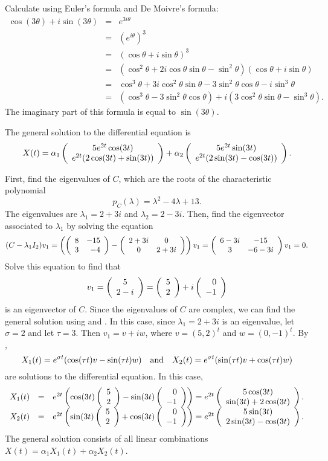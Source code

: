 \soln Calculate using Euler's formula and De Moivre's formula:
\[
\begin{array}{rcl}
\cos(3\theta) + i\sin(3\theta)
& = & e^{3i\theta} \\
& = & (e^{i\theta})^3 \\
& = & (\cos\theta + i\sin\theta)^3 \\
& = & (\cos^2\theta + 2i\cos\theta\sin\theta - \sin^2\theta)
(\cos\theta + i\sin\theta) \\
& = & \cos^3\theta + 3i\cos^2\theta\sin\theta -
3\sin^2\theta\cos\theta - i\sin^3\theta \\
& = & (\cos^3\theta - 3\sin^2\theta\cos\theta) +
i(3\cos^2\theta\sin\theta - \sin^3\theta).
\end{array}
\]
The imaginary part of this formula is equal to $\sin(3\theta)$.

\ans The general solution to the differential equation is
\[
X(t) =
\alpha_1\left(\begin{array}{c} 5e^{2t}\cos(3t) \\ e^{2t}(2\cos(3t) + \sin(3t))\end{array}\right) +
\alpha_2\left(\begin{array}{c} 5e^{2t}\sin(3t) \\ e^{2t}(2\sin(3t) - \cos(3t))\end{array}\right).
\]

\soln First, find the eigenvalues of $C$, which are the roots of the
characteristic polynomial
\[
p_C(\lambda) = \lambda^2 - 4\lambda + 13.
\]
The eigenvalues are $\lambda_1 = 2 + 3i$ and $\lambda_2 = 2 - 3i$.  Then,
find the eigenvector associated to $\lambda_1$ by solving the equation
\[
(C - \lambda_1I_2)v_1 =
\left(\left(\begin{array}{rr} 8 & -15\\ 3 &-4\end{array}\right) - \left(\begin{array}{cc} 2 + 3i & 0\\ 0 &2 + 3i\end{array}\right)\right)v_1
= \left(\begin{array}{cc} 6 - 3i & -15\\ 3 &-6 - 3i\end{array}\right)v_1 = 0.
\]
Solve this equation to find that
\[
v_1 = \left(\begin{array}{c} 5 \\ 2 - i\end{array}\right) = \left(\begin{array}{r} 5 \\ 2\end{array}\right) + i\left(\begin{array}{r} 0 \\ -1\end{array}\right)
\]
is an eigenvector of $C$.  Since the eigenvalues of $C$ are complex, we
can find the general solution using  and .  In this
case, since $\lambda_1 = 2 + 3i$ is
an eigenvalue, let $\sigma = 2$ and let $\tau = 3$.  Then $v_1 = v + iw$,
where $v = (5,2)^t$ and $w = (0,-1)^t$.  By ,
\[
X_1(t) = e^{\sigma t}(\cos(\tau t)v - \sin(\tau t)w) \quad\mbox{and}\quad
X_2(t) = e^{\sigma t}(\sin(\tau t)v + \cos(\tau t)w)
\]
are solutions to the differential equation.  In this case,
\[
\begin{array}{rcl}
X_1(t) & = & e^{2t}\left(\cos(3t)\left(\begin{array}{r} 5 \\ 2\end{array}\right) -
\sin(3t)\left(\begin{array}{r} 0 \\ -1\end{array}\right)\right)
= e^{2t}\left(\begin{array}{c} 5\cos(3t) \\ \sin(3t) + 2\cos(3t)\end{array}\right). \\
X_2(t) & = & e^{2t}\left(\sin(3t)\left(\begin{array}{r} 5 \\ 2\end{array}\right) +
\cos(3t)\left(\begin{array}{r} 0 \\ -1\end{array}\right)\right)
= e^{2t}\left(\begin{array}{c} 5\sin(3t) \\ 2\sin(3t) - \cos(3t)\end{array}\right).
\end{array}
\]
The general solution consists of all linear combinations
$X(t) = \alpha_1X_1(t) + \alpha_2X_2(t)$.

